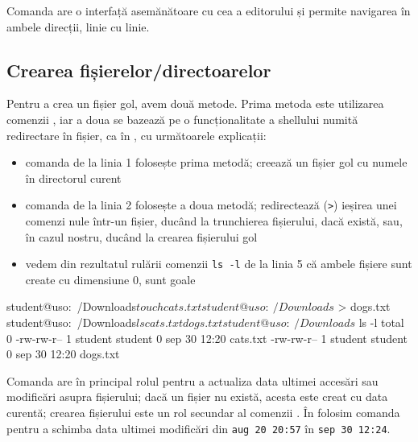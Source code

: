 Comanda  are o interfață asemănătoare cu cea a editorului  și permite navigarea în ambele direcții, linie cu linie.

\subsection{Crearea fișierelor/directoarelor}
\label{sec:fs:file-create}

Pentru a crea un fișier gol, avem două metode. Prima metoda este utilizarea comenzii , iar a doua se bazează pe o funcționalitate a shellului numită redirectare în fișier, ca în , cu următoarele explicații:
\begin{itemize}
  \item comanda de la linia 1 folosește prima metodă; creează un fișier gol cu numele  în directorul curent
  \item comanda de la linia 2 folosește a doua metodă; redirectează (\texttt{>}) ieșirea unei comenzi nule într-un fișier, ducând la trunchierea fișierului, dacă există, sau, în cazul nostru, ducând la crearea fișierului gol 
  \item vedem din rezultatul rulării comenzii \texttt{ls -l} de la linia 5 că ambele fișiere sunt create cu dimensiune 0, sunt goale
\end{itemize}

\begin{screen}[caption={Crearea unui fișier},label={lst:fs:create-file}]
student@uso:~/Downloads$ touch cats.txt
student@uso:~/Downloads$ > dogs.txt
student@uso:~/Downloads$ ls
cats.txt  dogs.txt
student@uso:~/Downloads$ ls -l
total 0
-rw-rw-r-- 1 student student 0 sep 30 12:20 cats.txt
-rw-rw-r-- 1 student student 0 sep 30 12:20 dogs.txt
\end{screen}

Comanda  are în principal rolul pentru a actualiza data ultimei accesări sau modificări asupra fișierului; dacă un fișier nu există, acesta este creat cu data curentă; crearea fișierului este un rol secundar al comenzii . În  folosim comanda  pentru a schimba data ultimei modificări din \texttt{aug 20 20:57} în \texttt{sep 30 12:24}.


